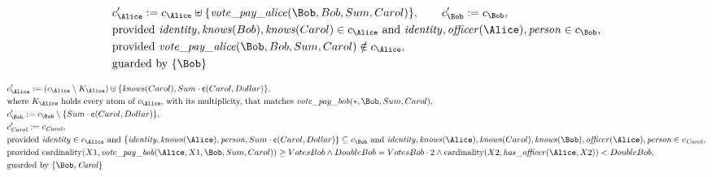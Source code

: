 \begin{align*}
&
c'_
{
\Alice
}
 := 
c_
{
\Alice
}
 \uplus 
\{
\mathit{\detokenize{
vote_pay_alice
}}
(
\Bob
,
Bob
,
Sum
,
Carol
)
\}
, \qquad 
c'_
{
\Bob
}
 := 
c_
{
\Bob
}
,\\
&
\text{provided } 
\mathit{\detokenize{
identity
}}
,
\mathit{\detokenize{
knows
}}
(
Bob
)
,
\mathit{\detokenize{
knows
}}
(
Carol
)
 \in c_
{
\Alice
}
 \text{ and } 
\mathit{\detokenize{
identity
}}
,
\mathit{\detokenize{
officer
}}
(
\Alice
)
,
\mathit{\detokenize{
person
}}
 \in c_
{
\Bob
}
,\\
&
\text{provided } 
\mathit{\detokenize{
vote_pay_alice
}}
(
\Bob
,
Bob
,
Sum
,
Carol
)
 \notin c_
{
\Alice
}
,\\
&
\text{guarded by } \{
\Bob
\}
\end{align*}

\begin{align*}
&
c'_
{
\Alice
}
 := 
(
c_
{
\Alice
}
 \setminus K_
{
\Alice
}
) \uplus 
\{
\mathit{\detokenize{
knows
}}
(
Carol
)
,
Sum
\cdot
\text{\textcent}
(
Carol
,
Dollar
)
\}
,\\
&
\text{where } K_
{
\Alice
}
 \text{ holds every atom of } c_
{
\Alice
}
 \text{, with its multiplicity, that matches } 
\mathit{\detokenize{
vote_pay_bob
}}
(
\ast
,
\Bob
,
Sum
,
Carol
)
,\\
&
c'_
{
\Bob
}
 := 
c_
{
\Bob
}
 \setminus 
\{
Sum
\cdot
\text{\textcent}
(
Carol
,
Dollar
)
\}
,\\
&
c'_
{
\mathit{Carol}
}
 := 
c_
{
\mathit{Carol}
}
,\\
&
\text{provided } 
\mathit{\detokenize{
identity
}}
 \in c_
{
\Alice
}
 \text{ and } 
\{
\mathit{\detokenize{
identity
}}
,
\mathit{\detokenize{
knows
}}
(
\Alice
)
,
\mathit{\detokenize{
person
}}
,
Sum
\cdot
\text{\textcent}
(
Carol
,
Dollar
)
\}
 \subseteq c_
{
\Bob
}
 \text{ and } 
\mathit{\detokenize{
identity
}}
,
\mathit{\detokenize{
knows
}}
(
\Alice
)
,
\mathit{\detokenize{
knows
}}
(
Carol
)
,
\mathit{\detokenize{
knows
}}
(
\Bob
)
,
\mathit{\detokenize{
officer
}}
(
\Alice
)
,
\mathit{\detokenize{
person
}}
 \in c_
{
\mathit{Carol}
}
,\\
&
\text{provided } 
\mathrm{cardinality}(
X1
,
\mathit{\detokenize{
vote_pay_bob
}}
(
\Alice
,
X1
,
\Bob
,
Sum
,
Carol
)
)
\ge
VotesBob
\land
DoubleBob
=
VotesBob
\cdot
2
\land
\mathrm{cardinality}(
X2
,
\mathit{\detokenize{
has_officer
}}
(
\Alice
,
X2
)
)
<
DoubleBob
,\\
&
\text{guarded by } \{
\Bob
,
\mathit{Carol}
\}
\end{align*}
